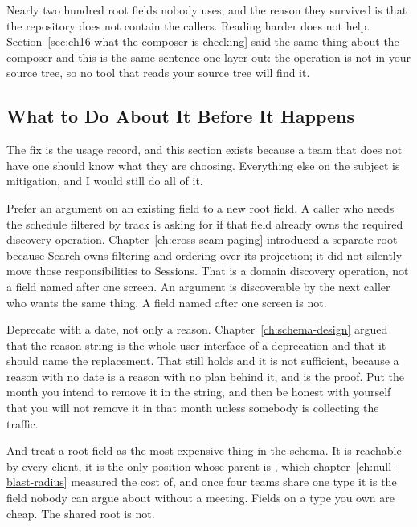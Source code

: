 %
Nearly two hundred root fields nobody uses, and the reason they survived is
that the repository does not contain the callers. Reading harder does not help.
Section~\ref{sec:ch16-what-the-composer-is-checking} said the same thing about
the composer and this is the same sentence one layer out: the operation is not
in your source tree, so no tool that reads your source tree will find it.

\subsection{What to Do About It Before It Happens}

%
The fix is the usage record, and this section exists because a team that does
not have one should know what they are choosing. Everything else on the
subject is mitigation, and I would still do all of it.

%
Prefer an argument on an existing field to a new root field. A caller who
needs the schedule filtered by track is asking for
 if that field already owns the required discovery
operation. Chapter~\ref{ch:cross-seam-paging} introduced a separate
 root because Search owns filtering and ordering over
its projection; it did not silently move those responsibilities to Sessions.
That is a domain discovery operation, not a field named after one screen.
An argument is discoverable by the next caller
who wants the same thing. A field named after one screen is not.

%
Deprecate with a date, not only a reason.
Chapter~\ref{ch:schema-design} argued that the reason string is the whole user
interface of a deprecation and that it should name the replacement. That
still holds and it is not sufficient, because a reason with no date is a
reason with no plan behind it, and  is the proof. Put the
month you intend to remove it in the string, and then be honest with yourself
that you will not remove it in that month unless somebody is collecting the
traffic.

%
And treat a root field as the most expensive thing in the schema. It is
reachable by every client, it is the only position whose parent is
, which chapter~\ref{ch:null-blast-radius} measured the cost of,
and once four teams share one  type it is the field nobody can
argue about without a meeting. Fields on a type you own are cheap. The shared
root is not.

